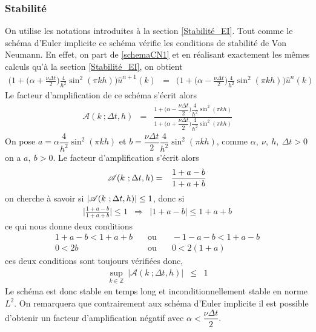 \subsubsection{Stabilité}
On utilise les notations introduites à la section \ref{Stabilité_EI}. Tout comme le schéma d'Euler implicite ce schéma vérifie les conditions de stabilité de Von Neumann. En effet, on part de \eqref{schemaCN1} et en réalisant exactement les mêmes calculs qu'à la section \eqref{Stabilité_EI}, on obtient
\begin{eqnarray*}
    \Big(1+\Big(\alpha +\frac{\nu \Delta t}{2}\Big) \frac{4}{h^2}\sin^2(\pi k h)\Big)\hat{u}^{n+1}(k) &=& \Big(1+\Big(\alpha - \frac{\nu \Delta t}{2}\Big) \frac{4}{h^2}\sin^2(\pi kh)\Big)\hat{u}^{n}(k)
\end{eqnarray*}
Le facteur d'amplification de ce schéma s'écrit alors
\begin{eqnarray*}
    \mathscr{A}(k \ ; \Delta t ,h) &=& \frac{1+\Big(\alpha - \dfrac{\nu \Delta t}{2}\Big) \dfrac{4}{h^2}\sin^2(\pi kh)}{1+\Big(\alpha +\dfrac{\nu \Delta t}{2}\Big) \dfrac{4}{h^2}\sin^2(\pi kh) }
\end{eqnarray*}
On pose $a=\alpha \dfrac{4}{h^2}\sin^2(\pi kh)$ et $b=\dfrac{\nu \Delta t}{2}\dfrac{4}{h^2}\sin^2(\pi kh)$, comme $\alpha, \ \nu, \ h, \ \Delta t >0$ on a $a, \ b >0$. Le facteur d'amplification s'écrit alors
\begin{eqnarray*}
    \mathscr{A}(k \ ; \Delta t ,h) &=& \frac{1+a-b}{1+a+b}
\end{eqnarray*}
on cherche à savoir si $|\mathscr{A}(k \ ; \Delta t ,h)| \leq 1$, donc si 
\begin{eqnarray*}
    \bigg|\frac{1+a-b}{1+a+b}\bigg| \leq 1 &\Longrightarrow& |1+a-b| \leq 1+a+b
\end{eqnarray*}
ce qui nous donne deux conditions
\begin{eqnarray*}
    1+a-b < 1+a+b \ \ \ &\text{ ou }& \ \ \ -1-a-b < 1+a-b \\
    0 < 2b \ \ \ &\text{ ou }& \ \ \ 0 < 2(1+a)
\end{eqnarray*}
ces deux conditions sont toujours vérifiées donc,
\begin{eqnarray*}
    \sup_{k \in \mathbb{Z}} \ |\mathscr{A}(k \ ; \Delta t ,h)| &\leq& 1
\end{eqnarray*}
Le schéma est donc stable en temps long et inconditionnellement stable en norme $L^2$.
On remarquera que contrairement aux schéma d'Euler implicite il est possible d'obtenir un facteur d'amplification négatif avec $\alpha < \dfrac{\nu \Delta t}{2}$.

